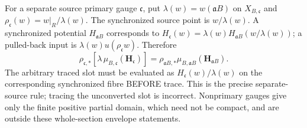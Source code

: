 For a separate source primary gauge $\mathfrak c$, put $\lambda(w)=w(\mathfrak aB)$ on $X_{B,\mathfrak c}$ and $\rho_{\mathfrak c}(w)=w|_R/\lambda(w)$. The synchronized source point is $w/\lambda(w)$. A synchronized potential $H_{\mathfrak aB}$ corresponds to
$H_{\mathfrak c}(w)=\lambda(w)H_{\mathfrak aB}(w/\lambda(w))$;
a pulled-back input is $\lambda(w)u(\rho_{\mathfrak c}w)$. Therefore
\[
\rho_{\mathfrak c,*}[\lambda\,\mu_{B,\mathfrak c}(\boldsymbol H_{\mathfrak c})]
=\rho_{\mathfrak aB,*}\mu_{B,\mathfrak aB}(\boldsymbol H_{\mathfrak aB}). \tag{26}
\]
The arbitrary traced slot must be evaluated as $H_{\mathfrak c}(w)/\lambda(w)$ on the corresponding synchronized fibre BEFORE trace. This is the precise separate-source rule; tracing the unconverted slot is incorrect. Nonprimary gauges give only the finite positive partial domain, which need not be compact, and are outside these whole-section envelope statements.
